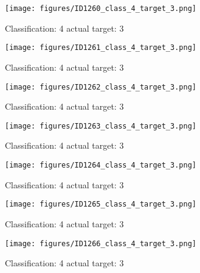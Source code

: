 \begin{figure}[h!]
\begin{center}
\texttt{[image: figures/ID1260\_class\_4\_target\_3.png]}
\end{center}
\caption{ Classification: 4 actual target: 3}
\label{fig:ID1260_class_4_target_3}
\end{figure}
\begin{figure}[h!]
\begin{center}
\texttt{[image: figures/ID1261\_class\_4\_target\_3.png]}
\end{center}
\caption{ Classification: 4 actual target: 3}
\label{fig:ID1261_class_4_target_3}
\end{figure}
\begin{figure}[h!]
\begin{center}
\texttt{[image: figures/ID1262\_class\_4\_target\_3.png]}
\end{center}
\caption{ Classification: 4 actual target: 3}
\label{fig:ID1262_class_4_target_3}
\end{figure}
\begin{figure}[h!]
\begin{center}
\texttt{[image: figures/ID1263\_class\_4\_target\_3.png]}
\end{center}
\caption{ Classification: 4 actual target: 3}
\label{fig:ID1263_class_4_target_3}
\end{figure}
\begin{figure}[h!]
\begin{center}
\texttt{[image: figures/ID1264\_class\_4\_target\_3.png]}
\end{center}
\caption{ Classification: 4 actual target: 3}
\label{fig:ID1264_class_4_target_3}
\end{figure}
\begin{figure}[h!]
\begin{center}
\texttt{[image: figures/ID1265\_class\_4\_target\_3.png]}
\end{center}
\caption{ Classification: 4 actual target: 3}
\label{fig:ID1265_class_4_target_3}
\end{figure}
\begin{figure}[h!]
\begin{center}
\texttt{[image: figures/ID1266\_class\_4\_target\_3.png]}
\end{center}
\caption{ Classification: 4 actual target: 3}
\label{fig:ID1266_class_4_target_3}
\end{figure}
